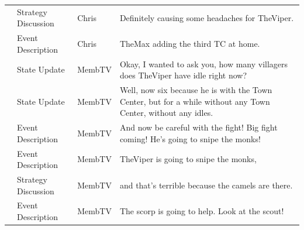 {\begin{longtable}{@{}>{\theAppRow}r|L{2.3cm}L{1.0cm}U{11.55cm}@{}}
    & Strategy Discussion   & Chris        & Definitely causing some headaches for TheViper.                                                                                                                                                                                                                  \\
    & Event Description     & Chris        & TheMax adding the third TC at home.                                                                                                                                                                                                                              \\
    & State Update          & MembTV       & Okay, I wanted to ask you, how many villagers does TheViper have idle right now?                                                                                                                                                                                 \\
    & State Update          & MembTV       & Well, now six because he is with the Town Center, but for a while without any Town Center, without any idles.                                                                                                                                                    \\
    & Event Description     & MembTV       & And now be careful with the fight! Big fight coming! He's going to snipe the monks!                                                                                                                                                                              \\
    & Event Description     & MembTV       & TheViper is going to snipe the monks,                                                                                                                                                                                                                            \\
    & Strategy Discussion   & MembTV       & and that's terrible because the camels are there.                                                                                                                                                                                                                \\
    & Event Description     & MembTV       & The scorp is going to help. Look at the scout!                                                                                                                                                                                                                   \\

\end{longtable}}
